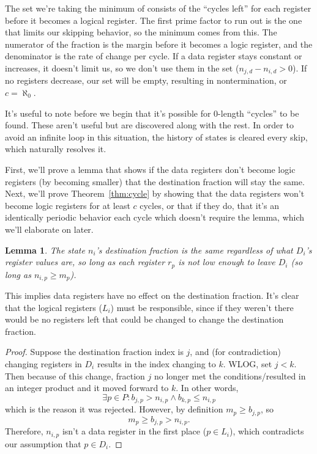 \documentclass[12pt]{article}
\newtheorem{lemma}{Lemma}
\begin{document}
The set we're taking the minimum of consists of the ``cycles left'' for each register before it becomes a logical register. The first prime factor to run out is the one that limits our skipping behavior, so the minimum comes from this. The numerator of the fraction is the margin before it becomes a logic register, and the denominator is the rate of change per cycle. If a data register stays constant or increases, it doesn't limit us, so we don't use them in the set ($n_{j,d} - n_{i,d} > 0$). If no registers decrease, our set will be empty, resulting in nontermination, or $c = \aleph_0$.

It's useful to note before we begin that it's possible for 0-length ``cycles'' to be found. These aren't useful but are discovered along with the rest. In order to avoid an infinite loop in this situation, the history of states is cleared every skip, which naturally resolves it.

First, we'll prove a lemma that shows if the data registers don't become logic registers (by becoming smaller) that the destination fraction will stay the same. Next, we'll prove Theorem~\ref{thm:cycle} by showing that the data registers won't become logic registers for at least $c$ cycles, or that if they do, that it's an identically periodic behavior each cycle which doesn't require the lemma, which we'll elaborate on later.

\begin{lemma}\label{lem:data}
The state $n_i$'s destination fraction is the same regardless of what $D_i$'s register values are, so long as each register $r_p$ is not low enough to leave $D_i$ (so long as $n_{i,p} \geq m_p$).
\end{lemma}

This implies data registers have no effect on the destination fraction. It's clear that the logical registers ($L_i$) must be responsible, since if they weren't there would be no registers left that could be changed to change the destination fraction.

\begin{proof}
Suppose the destination fraction index is $j$, and (for contradiction) changing registers in $D_i$ results in the index changing to $k$. WLOG, set $j < k$. Then because of this change, fraction $j$ no longer met the conditions/resulted in an integer product and it moved forward to $k$. In other words,
\[
\exists p \in P : b_{j,p} > n_{i,p} \wedge b_{k,p} \leq n_{i,p}
\]
which is the reason it was rejected. However, by definition $m_p \geq b_{j,p}$, so
\[
m_p \geq b_{j,p} > n_{i,p}.
\]
Therefore, $n_{i,p}$ isn't a data register in the first place ($p \in L_i$), which contradicts our assumption that $p \in D_i$.
\end{proof}
\end{document}

